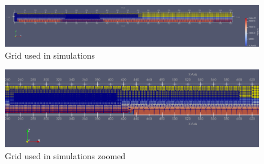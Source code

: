 \begin{figure}[h]
    \centering
    \includegraphics[width=\linewidth]{figures/Methodology/grid2.png}
    \caption{Grid used in simulations}
    \label{fig: grid used methodology}
\end{figure}

\begin{figure}[h]
    \centering
    \includegraphics[width=\linewidth]{figures/Methodology/grid zoomed 2.png}
    \caption{Grid used in simulations zoomed}
    \label{fig: zoomed grid used methodology}
\end{figure}






